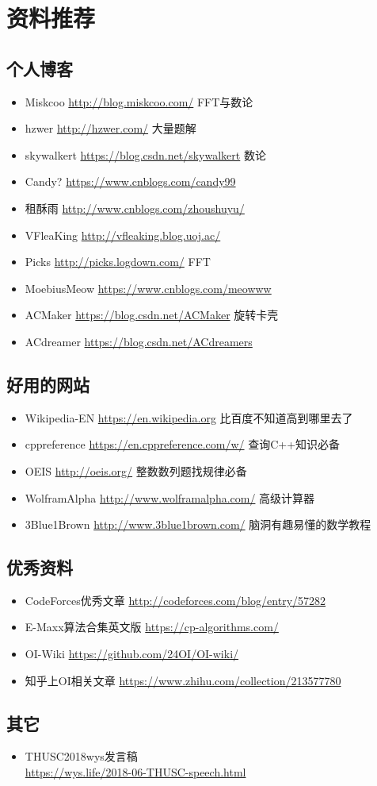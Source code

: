 \chapter{资料推荐}
\section{个人博客}
\begin{itemize}
	\item Miskcoo \url{http://blog.miskcoo.com/} FFT与数论
	\item hzwer \url{http://hzwer.com/} 大量题解
    \item skywalkert \url{https://blog.csdn.net/skywalkert} 数论
    \item Candy? \url{https://www.cnblogs.com/candy99}
    \item 租酥雨 \url{http://www.cnblogs.com/zhoushuyu/}
    \item VFleaKing \url{http://vfleaking.blog.uoj.ac/}
    \item Picks \url{http://picks.logdown.com/} FFT
    \item MoebiusMeow \url{https://www.cnblogs.com/meowww}
    \item ACMaker \url{https://blog.csdn.net/ACMaker} 旋转卡壳
    \item ACdreamer \url{https://blog.csdn.net/ACdreamers}
\end{itemize}
\section{好用的网站}
\begin{itemize}
    \item Wikipedia-EN \url{https://en.wikipedia.org} 比百度不知道高到哪里去了
    \item cppreference \url{https://en.cppreference.com/w/} 查询C++知识必备
    \item OEIS \url{http://oeis.org/} 整数数列题找规律必备
    \item WolframAlpha \url{http://www.wolframalpha.com/} 高级计算器
    \item 3Blue1Brown \url{http://www.3blue1brown.com/} 脑洞有趣易懂的数学教程
\end{itemize}
\section{优秀资料}
\begin{itemize}
    \item CodeForces优秀文章 \url{http://codeforces.com/blog/entry/57282}
    \item E-Maxx算法合集英文版 \url{https://cp-algorithms.com/}
    \item OI-Wiki \url{https://github.com/24OI/OI-wiki/}
    \item 知乎上OI相关文章 \url{https://www.zhihu.com/collection/213577780}
\end{itemize}
\section{其它}
\begin{itemize}
    \item THUSC2018wys发言稿 \\\url{https://wys.life/2018-06-THUSC-speech.html}
\end{itemize}
